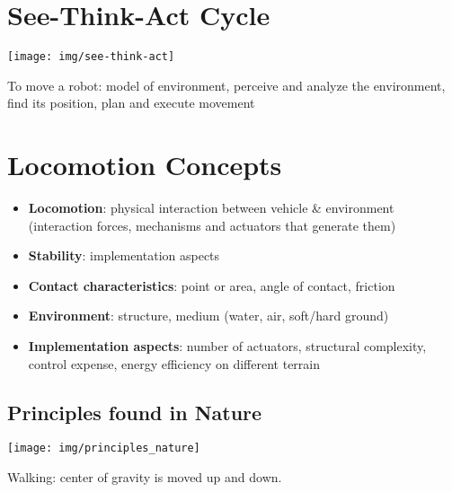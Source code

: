 \documentclass[fontsize=6pt]{scrartcl}
\begin{document}
\raggedcolumns
\setlength{\abovedisplayskip}{4.0pt plus 2.0pt minus 2.0pt}
\setlength{\belowdisplayskip}{4.0pt plus 2.0pt minus 2.0pt}

\begin{multicols*}{4}

\section*{See-Think-Act Cycle}

{\centering
\texttt{[image: img/see-think-act]}
\par}

To move a robot: model of environment, perceive and analyze the environment, find its position, plan and execute movement

\section*{Locomotion Concepts}

\begin{itemize}
	\item \textbf{Locomotion}:  physical interaction between vehicle \& environment (interaction forces, mechanisms and actuators that generate them)
	\item \textbf{Stability}:  implementation aspects
	\item \textbf{Contact characteristics}:  point or area, angle of contact, friction
	\item \textbf{Environment}:  structure, medium (water, air, soft/hard ground)
	\item \textbf{Implementation aspects}:  number of actuators, structural complexity, control expense, energy efficiency on different terrain
\end{itemize}

\subsection*{Principles found in Nature}
{\centering
	\texttt{[image: img/principles\_nature]}
\par}

Walking: center of gravity is moved up and down.


\end{multicols*}
\end{document}
